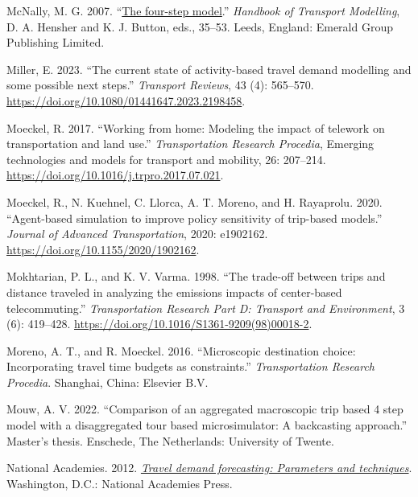 \documentclass[fancy, twoside, mastersfancy, ms]{byuthesis}
\newlength{\cslhangindent}
\newenvironment{CSLReferences}[2] %
 {\begin{list}{}{%
  \setlength{\itemindent}{0pt}
  \setlength{\leftmargin}{0pt}
  \setlength{\parsep}{0pt}
  \ifodd #1
   \setlength{\leftmargin}{\cslhangindent}
   \setlength{\itemindent}{-1\cslhangindent}
  \fi
  \setlength{\itemsep}{#2\baselineskip}}}
 {\end{list}}
\begin{document}
\begin{CSLReferences}{1}{0}
McNally, M. G. 2007.
{``\href{https://doi.org/10.1108/9780857245670-003}{The four-step
model}.''} \emph{Handbook of {Transport Modelling}}, D. A. Hensher and
K. J. Button, eds., 35--53. Leeds, England: Emerald Group Publishing
Limited.

Miller, E. 2023. {``The current state of activity-based travel demand
modelling and some possible next steps.''} \emph{Transport Reviews}, 43
(4): 565--570. \url{https://doi.org/10.1080/01441647.2023.2198458}.

Moeckel, R. 2017. {``Working from home: Modeling the impact of telework
on transportation and land use.''} \emph{Transportation Research
Procedia}, Emerging technologies and models for transport and mobility,
26: 207--214. \url{https://doi.org/10.1016/j.trpro.2017.07.021}.

Moeckel, R., N. Kuehnel, C. Llorca, A. T. Moreno, and H. Rayaprolu.
2020. {``Agent-based simulation to improve policy sensitivity of
trip-based models.''} \emph{Journal of Advanced Transportation}, 2020:
e1902162. \url{https://doi.org/10.1155/2020/1902162}.

Mokhtarian, P. L., and K. V. Varma. 1998. {``The trade-off between trips
and distance traveled in analyzing the emissions impacts of center-based
telecommuting.''} \emph{Transportation Research Part D: Transport and
Environment}, 3 (6): 419--428.
\url{https://doi.org/10.1016/S1361-9209(98)00018-2}.

Moreno, A. T., and R. Moeckel. 2016. {``Microscopic destination choice:
Incorporating travel time budgets as constraints.''}
\emph{Transportation {Research Procedia}}. Shanghai, China: Elsevier
B.V.

Mouw, A. V. 2022. {``Comparison of an aggregated macroscopic trip based
4 step model with a disaggregated tour based microsimulator: A
backcasting approach.''} Master's thesis. Enschede, The Netherlands:
University of Twente.

National Academies. 2012.
\emph{\href{https://doi.org/10.17226/14665}{Travel demand forecasting:
Parameters and techniques}}. Washington, D.C.: National Academies Press.


\end{CSLReferences}
\end{document}
